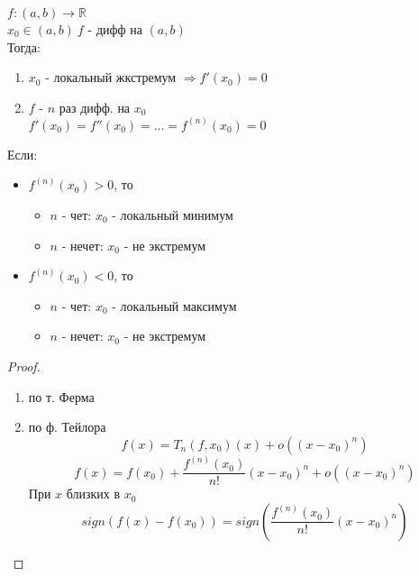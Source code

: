 \documentclass[12pt]{article}
\begin{document}
\begin{theorem}
  $f: (a, b) \rightarrow \mathbb{R}$ \\
  $x_0 \in (a, b)\ f$ - дифф на $(a, b)$ \\
  Тогда:
  \begin{enumerate}
  \item $x_0$ - локальный жкстремум $\Rightarrow f'(x_0) = 0$
  \item $f$ - $n$ раз дифф. на $x_0$ \\
    $f'(x_0) = f''(x_0) = \dots = f^{(n)}(x_0) = 0$
  \end{enumerate}
  Если:
  \begin{itemize}
  \item $f^{(n)}(x_0) > 0$, то
    \begin{itemize}
    \item $n$ - чет: $x_0$ - локальный минимум
    \item $n$ - нечет: $x_0$ - не экстремум
    \end{itemize}
  \item $f^{(n)}(x_0) < 0$, то
    \begin{itemize}
    \item $n$ - чет: $x_0$ - локальный максимум
    \item $n$ - нечет: $x_0$ - не экстремум
    \end{itemize}
  \end{itemize}
\end{theorem}
\begin{proof}
  \begin{enumerate}
  \item по т. Ферма
  \item по ф. Тейлора \\
    $$f(x) = T_n(f, x_0)(x) + o((x - x_0)^n)$$
    $$f(x) = f(x_0) + \frac{f^{(n)}(x_0)}{n!}(x-x_0)^n + o((x - x_0)^n)$$
    При $x$ близких в $x_0$
    $$sign(f(x) - f(x_0)) = sign(\frac{f^{(n)}(x_0)}{n!}(x-x_0)^n)$$
  \end{enumerate}
\end{proof}
\end{document}
